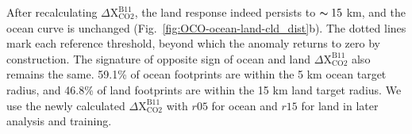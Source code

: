 After recalculating $\Delta \mathrm{X_{CO2}^{B11}}$, the land response indeed persists to $\thicksim15$ km, and the ocean curve is unchanged (Fig.~\ref{fig:OCO-ocean-land-cld_dist}b). The dotted lines mark each reference threshold, beyond which the anomaly returns to zero by construction. The signature of opposite sign of ocean and land $\Delta \mathrm{X_{CO2}^{B11}}$ also remains the same. 59.1\% of ocean footprints are within the 5 km ocean target radius, and 46.8\% of land footprints are within the 15 km land target radius. We use the newly calculated $\Delta \mathrm{X_{CO2}^{B11}}$ with $r05$ for ocean and $r15$ for land in later analysis and training.